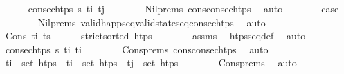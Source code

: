 \begin{isabellebody}
\ \ \ \ \isamarkupfalse%
\ {\isachardoublequoteopen}consec{\isacharunderscore}{\kern0pt}htps\ {\isasympi}s\ t\isactrlsub i\ t\isactrlsub j{\isachardoublequoteclose}\isanewline
\ \ \ \ \ \ \isamarkupfalse%
\ Nil{\isachardot}{\kern0pt}prems\ cons{\isacharunderscore}{\kern0pt}consec{\isacharunderscore}{\kern0pt}htps\ \isamarkupfalse%
\ auto\isanewline
\ \ \ \ \isamarkupfalse%
\ \isamarkupfalse%
\ {\isacharquery}{\kern0pt}case\ \isanewline
\ \ \ \ \ \ \isamarkupfalse%
\ Nil{\isachardot}{\kern0pt}prems\ valid{\isacharunderscore}{\kern0pt}happ{\isacharunderscore}{\kern0pt}seq{\isacharunderscore}{\kern0pt}valid{\isacharunderscore}{\kern0pt}state{\isacharunderscore}{\kern0pt}seq{\isacharunderscore}{\kern0pt}consec{\isacharunderscore}{\kern0pt}htps\ \isamarkupfalse%
\ auto\isanewline
\ \ \isamarkupfalse%
\isanewline
\ \ \ \ \isamarkupfalse%
\ {\isacharparenleft}{\kern0pt}Cons\ t\isactrlsub i{\isacharprime}{\kern0pt}\ ts\isanewline
\ \ \ \ \isamarkupfalse%
\ {\isachardoublequoteopen}strict{\isacharunderscore}{\kern0pt}sorted\ htps{\isachardoublequoteclose}\isanewline
\ \ \ \ \ \ \isamarkupfalse%
\ assms\ \isamarkupfalse%
\ htps{\isacharunderscore}{\kern0pt}seq{\isacharunderscore}{\kern0pt}def\ \isamarkupfalse%
\ auto\isanewline
\ \ \ \ \isamarkupfalse%
\ \isamarkupfalse%
\ {\isachardoublequoteopen}consec{\isacharunderscore}{\kern0pt}htps\ {\isasympi}s\ t\isactrlsub i\ t\isactrlsub i{\isacharprime}{\kern0pt}{\isachardoublequoteclose}\isanewline
\ \ \ \ \ \ \isamarkupfalse%
\ Cons{\isachardot}{\kern0pt}prems\ cons{\isacharunderscore}{\kern0pt}consec{\isacharunderscore}{\kern0pt}htps\ \isamarkupfalse%
\ auto\isanewline
\ \ \ \ \isamarkupfalse%
\ {\isachardoublequoteopen}t\isactrlsub i\ {\isasymin}\ set\ htps{\isachardoublequoteclose}\ \ {\isachardoublequoteopen}t\isactrlsub i{\isacharprime}{\kern0pt}\ {\isasymin}\ set\ htps{\isachardoublequoteclose}\ \ {\isachardoublequoteopen}t\isactrlsub j\ {\isasymin}\ set\ htps{\isachardoublequoteclose}\isanewline
\ \ \ \ \ \ \isamarkupfalse%
\ Cons{\isachardot}{\kern0pt}prems\ \isamarkupfalse%
\ auto\isanewline
\ \ \ \ \isamarkupfalse%

\end{isabellebody}
